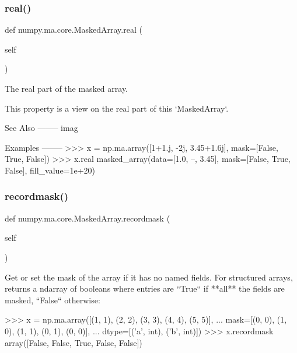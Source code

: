 \subsubsection{\texorpdfstring{real()}{real()}}
{\footnotesize\ttfamily def numpy.\+ma.\+core.\+Masked\+Array.\+real (\begin{DoxyParamCaption}\item[{}]{self }\end{DoxyParamCaption})}

\begin{DoxyVerb}The real part of the masked array.

This property is a view on the real part of this `MaskedArray`.

See Also
--------
imag

Examples
--------
>>> x = np.ma.array([1+1.j, -2j, 3.45+1.6j], mask=[False, True, False])
>>> x.real
masked_array(data=[1.0, --, 3.45],
     mask=[False,  True, False],
       fill_value=1e+20)\end{DoxyVerb}
 \mbox{\label{classnumpy_1_1ma_1_1core_1_1MaskedArray_ae5c1c17c660a3508d0e21d926af7584c}} 
\subsubsection{\texorpdfstring{recordmask()}{recordmask()}\hspace{0.1cm}{\footnotesize\ttfamily [1/2]}}
{\footnotesize\ttfamily def numpy.\+ma.\+core.\+Masked\+Array.\+recordmask (\begin{DoxyParamCaption}\item[{}]{self }\end{DoxyParamCaption})}

\begin{DoxyVerb}Get or set the mask of the array if it has no named fields. For
structured arrays, returns a ndarray of booleans where entries are
``True`` if **all** the fields are masked, ``False`` otherwise:

>>> x = np.ma.array([(1, 1), (2, 2), (3, 3), (4, 4), (5, 5)],
...         mask=[(0, 0), (1, 0), (1, 1), (0, 1), (0, 0)],
...        dtype=[('a', int), ('b', int)])
>>> x.recordmask
array([False, False,  True, False, False])
\end{DoxyVerb}
 \mbox{\label{classnumpy_1_1ma_1_1core_1_1MaskedArray_a534a10c03cf537ef6d7b2b52bfa6eb47}} 
